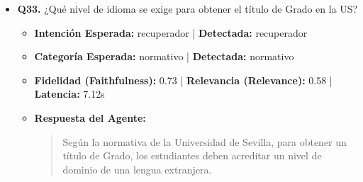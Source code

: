\documentclass[12pt,a4paper,oneside]{report}
\begin{document}
\begin{itemize}
\begin{itemize}
\begin{quote}
 Cabe mencionar que las solicitudes de reconocimiento de créditos por esta causa, así como las solicitudes de reconocimiento basadas en experiencia profesional, el reconocimiento por la acreditación de otros niveles de idioma y el reconocimiento de prácticas extracurriculares, podrán presentarse en cualquier momento del curso académico, según la normativa de la Universidad de Sevilla (R.R. NORMAS DE MATRICULA GRADO Y MASTER UNIVERSITARIO 2025-2026.pdf, página 43).
                \end{quote}
          \item \textbf{{Ground Truth (Referencia):}} \\
                \begin{quote}
Permite el reconocimiento académico de hasta 6 créditos optativos del plan de estudios de grado por participar en actividades de deporte, representación estudiantil, cultura o cooperación.
                \end{quote}
          \item \textbf{{Referencias / Fuentes Utilizadas:}} \\
                \begin{itemize}
                  \item Normativa Reconocimiento y Transferencia de creditos.pdf (Página 6)
                  \item R.R. NORMAS DE MATRICULA GRADO Y MASTER UNIVERSITARIO 2025-2026.pdf (Página 43)
                  \item Normativa Reconocimiento y Transferencia de creditos.pdf (Página 3)
                  \item R.R. NORMAS DE MATRICULA GRADO Y MASTER UNIVERSITARIO 2025-2026.pdf (Página 19)
                \end{itemize}
        \end{itemize}

  
\item \textbf{Q33.} ¿Qué nivel de idioma se exige para obtener el título de Grado en la US? \\
        \begin{itemize}
          \item \textbf{Intención Esperada:} recuperador | \textbf{Detectada:} recuperador
          \item \textbf{Categoría Esperada:} normativo | \textbf{Detectada:} normativo
          \item \textbf{Fidelidad (Faithfulness):} 0.73 | \textbf{Relevancia (Relevance):} 0.58 | \textbf{Latencia:} 7.12s
          \item \textbf{{Respuesta del Agente:}} \\
                \begin{quote}
Según la normativa de la Universidad de Sevilla, para obtener un título de Grado, los estudiantes deben acreditar un nivel de dominio de una lengua extranjera. 


\end{quote}
\end{itemize}
\end{itemize}
\end{document}
